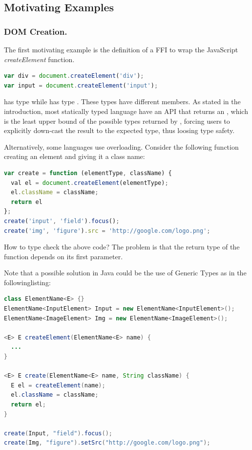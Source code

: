 \documentclass[runningheads,a4paper]{llncs}
\begin{document}

\subsection{Motivating Examples}

\subsubsection{DOM Creation.}

The first motivating example is the definition of a FFI to wrap the JavaScript \textit{createElement} function.

\begin{lstlisting}[language=JavaScript]
var div = document.createElement('div');
var input = document.createElement('input');
\end{lstlisting}

 has type  while  has type . These types
have different members. As stated in the introduction, most statically typed language have an API
that returns an , which is the least upper bound of the possible types returned by
, forcing users to explicitly down-cast the result to the expected type, thus
loosing type safety.

Alternatively, some languages use overloading. Consider the following function creating an element and giving it a class name:

\begin{lstlisting}[language=JavaScript]
var create = function (elementType, className) {
  val el = document.createElement(elementType);
  el.className = className;
  return el
};
create('input', 'field').focus();
create('img', 'figure').src = 'http://google.com/logo.png';
\end{lstlisting}

How to type check the above code? The problem is that the return type of the  function
depends on its first parameter.

Note that a possible solution in Java could be the use of Generic Types as in the followinglisting:

\begin{lstlisting}[language=Java,label=dom-generics]
class ElementName<E> {}
ElementName<InputElement> Input = new ElementName<InputElement>();
ElementName<ImageElement> Img = new ElementName<ImageElement>();

<E> E createElement(ElementName<E> name) {
  ...
}

<E> E create(ElementName<E> name, String className) {
  E el = createElement(name);
  el.className = className;
  return el;
}

create(Input, "field").focus();
create(Img, "figure").setSrc("http://google.com/logo.png");
\end{lstlisting}
\end{document}
